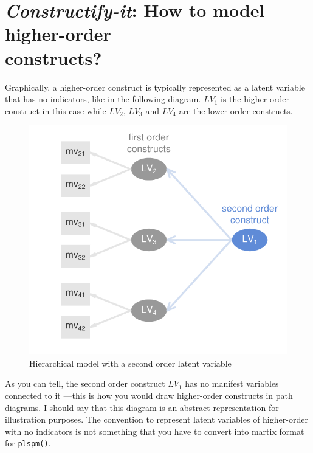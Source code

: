 \documentclass[12pt]{book}\usepackage{graphicx, color}
\newenvironment{knitrout}{}{} %
\newcommand{\fplspm}{\texttt{plspm()}}
\begin{document}
\section{\textit{Constructify-it}: How to model higher-order \\ constructs?}
Graphically, a higher-order construct is typically represented as a latent variable that has no indicators, like in the following diagram. $LV_1$ is the higher-order construct in this case while $LV_2$, $LV_3$ and $LV_4$ are the lower-order constructs.
\begin{knitrout}
\color{fgcolor}\begin{figure}[h]


{\centering \includegraphics[width=.7\linewidth,height=.5\linewidth]{figure/hierarchical_example1} 

}

\caption[Hierarchical model with a second order latent variable]{Hierarchical model with a second order latent variable\label{fig:hierarchical_example1}}
\end{figure}


\end{knitrout}


As you can tell, the second order construct $LV_1$ has no manifest variables connected to it ---this is how you would draw higher-order constructs in path diagrams. I should say that this diagram is an abstract representation for illustration purposes. The convention to represent latent variables of higher-order with no indicators is not something that you have to convert into martix format for \fplspm{}.
\end{document}
